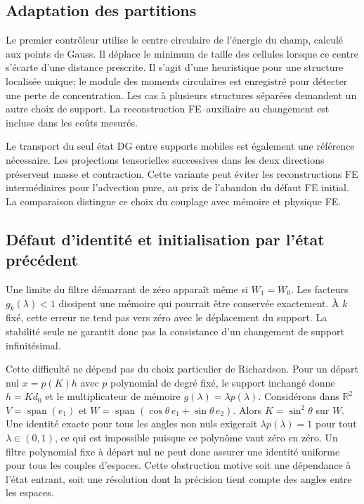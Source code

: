 \documentclass[11pt,a4paper]{article}
\begin{document}
\subsection{Adaptation des partitions}
Le premier contrôleur utilise le centre circulaire de l'énergie du champ,
calculé aux points de Gauss. Il déplace le minimum de taille des cellules
lorsque ce centre s'écarte d'une distance prescrite. Il s'agit d'une
heuristique pour une structure localisée unique; le module des moments
circulaires est enregistré pour détecter une perte de concentration.
Les cas à plusieurs structures séparées demandent un autre choix de
support. La reconstruction FE--auxiliaire au changement est incluse
dans les coûts mesurés.

Le transport du seul état DG entre supports mobiles est également une
référence nécessaire. Les projections tensorielles successives dans les
deux directions préservent masse et contraction. Cette variante peut
éviter les reconstructions FE intermédiaires pour l'advection pure, au
prix de l'abandon du défaut FE initial. La comparaison distingue ce
choix du couplage avec mémoire et physique FE.

\subsection{Défaut d'identité et initialisation par l'état précédent}
Une limite du filtre démarrant de zéro apparaît même si $W_1=W_0$.
Les facteurs $g_k(\lambda)<1$ dissipent une mémoire qui pourrait être
conservée exactement. À $k$ fixé, cette erreur ne tend pas vers zéro
avec le déplacement du support. La stabilité seule ne garantit donc
pas la consistance d'un changement de support infinitésimal.

Cette difficulté ne dépend pas du choix particulier de Richardson.
Pour un départ nul $x=p(K)h$ avec $p$ polynomial de degré fixé,
le support inchangé donne $h=Kd_0$ et le multiplicateur de mémoire
$g(\lambda)=\lambda p(\lambda)$. Considérons dans $\mathbb R^2$
$V=\operatorname{span}(e_1)$ et
$W=\operatorname{span}(\cos\theta\,e_1+\sin\theta\,e_2)$.
Alors $K=\sin^2\theta$ sur $W$. Une identité exacte pour tous les
angles non nuls exigerait $\lambda p(\lambda)=1$ pour tout
$\lambda\in(0,1)$, ce qui est impossible puisque ce polynôme vaut
zéro en zéro. Un filtre polynomial fixe à départ nul ne peut donc
assurer une identité uniforme pour tous les couples d'espaces.
Cette obstruction motive soit une dépendance à l'état entrant,
soit une résolution dont la précision tient compte des angles entre
les espaces.
\end{document}
